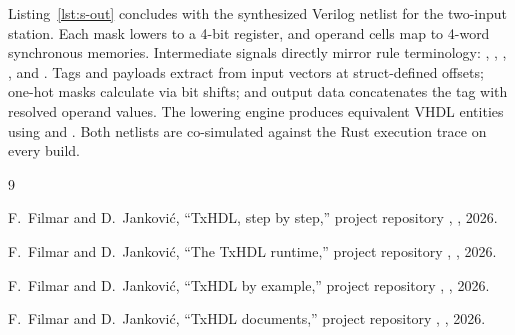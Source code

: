 \documentclass[journal,9pt]{IEEEtran}
\begin{document}
Listing~\ref{lst:s-out} concludes with the synthesized Verilog netlist for the
two-input station. Each mask lowers to a 4-bit register, and operand cells map
to 4-word synchronous memories. Intermediate signals directly mirror rule
terminology: , , ,
, and . Tags and payloads extract from input vectors
at struct-defined offsets; one-hot masks calculate via bit shifts; and output
data concatenates the tag with resolved operand values. The lowering engine
produces equivalent VHDL entities using  and .
Both netlists are co-simulated against the Rust execution trace on every build.

\begin{thebibliography}{9}

F.~Filmar and D.~Janković, ``TxHDL, step by step,'' project
repository , , 2026.

F.~Filmar and D.~Janković, ``The TxHDL runtime,'' project repository
, , 2026.

F.~Filmar and D.~Janković, ``TxHDL by example,'' project repository
, , 2026.

F.~Filmar and D.~Janković, ``TxHDL documents,'' project repository
, , 2026.

\end{thebibliography}
\end{document}

